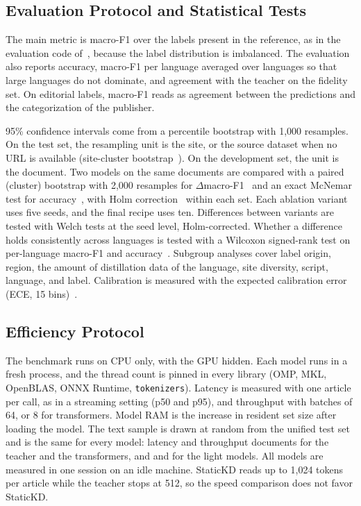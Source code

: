 \subsection{Evaluation Protocol and Statistical Tests}
\label{sec:protocol}
The main metric is macro-F1 over the labels present in the reference, as in the evaluation code of~\cite{kuzman2025llm}, because the label distribution is imbalanced. The evaluation also reports accuracy, macro-F1 per language averaged over languages so that large languages do not dominate, and agreement with the teacher on the fidelity set. On editorial labels, macro-F1 reads as agreement between the predictions and the categorization of the publisher.

95\% confidence intervals come from a percentile bootstrap with 1,000 resamples. On the test set, the resampling unit is the site, or the source dataset when no URL is available (site-cluster bootstrap~\cite{field2007bootstrapping}). On the development set, the unit is the document. Two models on the same documents are compared with a paired (cluster) bootstrap with 2,000 resamples for $\Delta$macro-F1~\cite{koehn2004significance} and an exact McNemar test for accuracy~\cite{mcnemar1947}, with Holm correction~\cite{holm1979} within each set. Each ablation variant uses five seeds, and the final recipe uses ten. Differences between variants are tested with Welch tests at the seed level, Holm-corrected. Whether a difference holds consistently across languages is tested with a Wilcoxon signed-rank test on per-language macro-F1 and accuracy~\cite{dror2018hitchhiker}. Subgroup analyses cover label origin, region, the amount of distillation data of the language, site diversity, script, language, and label. Calibration is measured with the expected calibration error (ECE, 15 bins)~\cite{guo2017calibration}.

\subsection{Efficiency Protocol}
\label{sec:effprotocol}
The benchmark runs on CPU only, with the GPU hidden. Each model runs in a fresh process, and the thread count is pinned in every library (OMP, MKL, OpenBLAS, ONNX Runtime, \texttt{tokenizers}). Latency is measured with one article per call, as in a streaming setting (p50 and p95), and throughput with batches of 64, or 8 for transformers. Model RAM is the increase in resident set size after loading the model. The text sample is drawn at random from the unified test set and is the same for every model:  latency and  throughput documents for the teacher and the transformers, and  and  for the light models. All models are measured in one session on an idle machine. StaticKD reads up to 1,024 tokens per article while the teacher stops at 512, so the speed comparison does not favor StaticKD.

